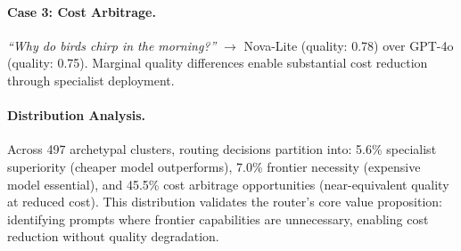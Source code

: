 \paragraph{Case 3: Cost Arbitrage.} \emph{``Why do birds chirp in the morning?''} $\to$ Nova-Lite (quality: 0.78) over GPT-4o (quality: 0.75). Marginal quality differences enable substantial cost reduction through specialist deployment.

\paragraph{Distribution Analysis.} Across 497 archetypal clusters, routing decisions partition into: 5.6\% specialist superiority (cheaper model outperforms), 7.0\% frontier necessity (expensive model essential), and 45.5\% cost arbitrage opportunities (near-equivalent quality at reduced cost). This distribution validates the router's core value proposition: identifying prompts where frontier capabilities are unnecessary, enabling cost reduction without quality degradation.
